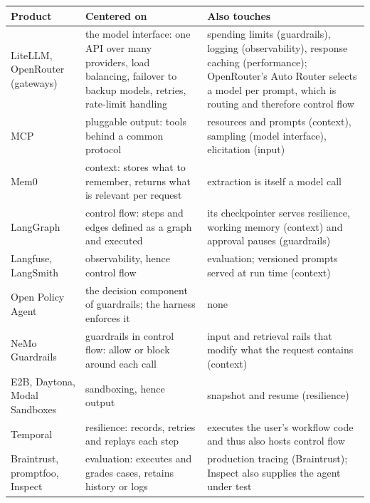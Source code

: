 {\def\LTcaptype{none} 
\begin{longtable}[]{@{}
  >{\raggedright\arraybackslash}p{}
  >{\raggedright\arraybackslash}p{}
  >{\raggedright\arraybackslash}p{}@{}}
\toprule\noalign{}
\begin{minipage}[b]{\linewidth}\raggedright
Product
\end{minipage} & \begin{minipage}[b]{\linewidth}\raggedright
Centered on
\end{minipage} & \begin{minipage}[b]{\linewidth}\raggedright
Also touches
\end{minipage} \\
\midrule\noalign{}
\endhead
\bottomrule\noalign{}
\endlastfoot
LiteLLM, OpenRouter (gateways) \cite{litellm,openrouter} & the model interface: one API over many providers, load balancing, failover to backup models, retries, rate-limit handling & spending limits (guardrails), logging (observability), response caching (performance); OpenRouter's Auto Router selects a model per prompt, which is routing and therefore control flow \\
MCP \cite{mcp} & pluggable output: tools behind a common protocol & resources and prompts (context), sampling (model interface), elicitation (input) \\
Mem0 \cite{mem0} & context: stores what to remember, returns what is relevant per request & extraction is itself a model call \\
LangGraph \cite{langgraph} & control flow: steps and edges defined as a graph and executed & its checkpointer serves resilience, working memory (context) and approval pauses (guardrails) \\
Langfuse, LangSmith \cite{langfuse,langsmith} & observability, hence control flow & evaluation; versioned prompts served at run time (context) \\
Open Policy Agent \cite{opa} & the decision component of guardrails; the harness enforces it & none \\
NeMo Guardrails \cite{nemo} & guardrails in control flow: allow or block around each call & input and retrieval rails that modify what the request contains (context) \\
E2B, Daytona, Modal Sandboxes \cite{e2b,daytona,modal} & sandboxing, hence output & snapshot and resume (resilience) \\
Temporal \cite{temporal} & resilience: records, retries and replays each step & executes the user's workflow code and thus also hosts control flow \\
Braintrust, promptfoo, Inspect \cite{braintrust,promptfoo,inspect} & evaluation: executes and grades cases, retains history or logs & production tracing (Braintrust); Inspect also supplies the agent under test \\
\end{longtable}
}

